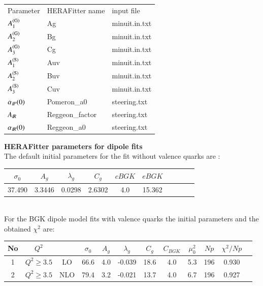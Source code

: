 \begin{description}

\begin{tabular}{l|l|l}
Parameter & HERAFitter name & input file\\
$A^{(\mathrm G)}_1$ & Ag & minuit.in.txt \\
$A^{(\mathrm G)}_2$ & Bg & minuit.in.txt \\
$A^{(\mathrm G)}_3$ & Cg & minuit.in.txt \\
$A^{(\mathrm S)}_1$ & Auv & minuit.in.txt \\
$A^{(\mathrm S)}_2$ & Buv & minuit.in.txt \\
$A^{(\mathrm S)}_3$ & Cuv & minuit.in.txt \\
$\alpha_{I\!P}(0)$ & Pomeron\_a0 & steering.txt \\
$A_{I\!R}$ & Reggeon\_factor & steering.txt \\
$\alpha_{I\!R}(0)$ & Reggeon\_a0 & steering.txt \\
\end{tabular}
\vspace{0.7cm}

{\bf HERAFitter parameters for dipole fits} \\
The default  initial parameters for the fit without valence quarks are : 
\begin{table}[h]
\tiny
\begin{center}
\begin{tabular}{|c||c||c||c|c||c|c|c||c|c|} 
\hline 
$\sigma_0$ & $A_g$ & $\lambda_g$ & $C_g$ & $cBGK$& $eBGK$\\
\hline
37.490 & 3.3446 & 0.0298 & 2.6302 & 4.0 & 15.362 \\
\hline
\end{tabular}
\end{center}
\end{table}
\\
For the BGK dipole model fits with valence quarks the initial parameters and the obtained $\chi^2$ are:

\begin{table}[ht]
\begin{center}
\begin{tabular}{|c||c||c||c|c||c|c|c||c|c|c||c|}
\hline
No&
$Q^2$&&
$\sigma_0$ & $A_g$ & $\lambda_g$ & $C_g$ & $C_{BGK}$& $\mu_{0}^2$& $Np$&
$\chi^2/Np$\\
\hline
1 &
$Q^2 \ge 3.5$ &  LO & 66.6 & 4.0 & -0.039 & 18.6& 4.0 & 5.3  & 196 &  0.930 \\
\hline
2 &
$Q^2 \ge 3.5$ & NLO & 79.4 & 3.2 &-0.021 & 13.7 & 4.0 & 6.7 & 196 & 0.927 \\
\hline
\end{tabular}
\end{center}
\end{table}
\end{description}


